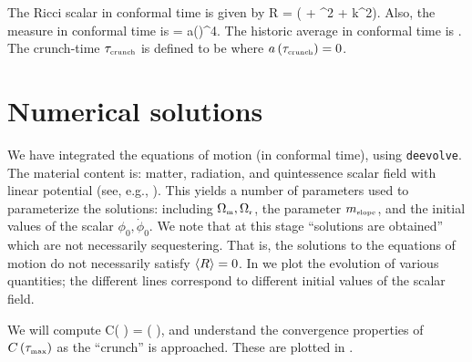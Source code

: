 \documentclass[amsmath,amssymb,12pt,eqsecnum]{revtex4}
\begin{document}
The Ricci scalar in conformal time is given by
\bea
R = \left( \dot{\hct} + \hct^2 + k^2\right).
\eea
Also, the measure in conformal time is
\bea
{} = a(\tau)^4.
\eea 
The historic average in conformal time is
\bea
{}  {}.
\eea
The crunch-time ${\tau}_{\scriptscriptstyle{\textrm{crunch}}}$ is defined to be where $a\left({\tau}_{\scriptscriptstyle{\textrm{crunch}}}\right)=0$.

\section{Numerical solutions}
We have integrated the equations of motion (in conformal time), using {\tt deevolve}. The material content is: matter, radiation, and quintessence scalar field with linear potential (see, e.g., \cite{Kallosh:2003bq}). This yields a number of parameters used to parameterize the solutions: including ${\Omega}_{\scriptscriptstyle{\textrm{m}}}, {\Omega}_{\scriptscriptstyle{\textrm{r}}}$, the parameter ${m}_{\scriptscriptstyle{\textrm{slope}}}$, and the initial values of the scalar $\phi_0, \dot{\phi}_0$. We note that at this stage ``solutions are obtained'' which are not necessarily sequestering. That is, the solutions to the equations of motion do not necessarily satisfy $\left\langle R\right\rangle=0$. In  we plot the evolution of various quantities; the different lines correspond to different  initial values of the scalar field.

We will compute
\bea
C\left( \right)  {} = \left( \right),
\eea
and understand the convergence properties of $C\left( {\tau}_{\scriptscriptstyle{\textrm{max}}}\right)$ as the ``crunch'' is approached. These are plotted in .
\end{document}
